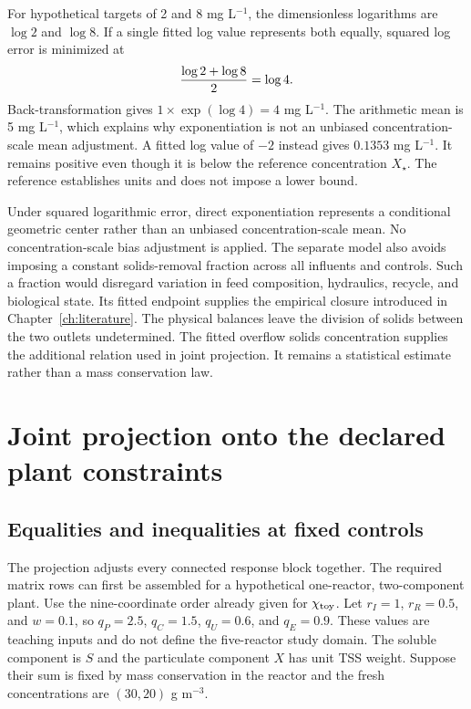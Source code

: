 For hypothetical targets of 2 and 8 mg L$^{-1}$, the dimensionless logarithms are $\log2$ and $\log8$. If a single fitted log value represents both equally, squared log error is minimized at
\begin{equation}
\equationname{Illustrative logarithmic average and geometric concentration mean}
\frac{\log2+\log8}{2}=\log4.
\end{equation}
Back-transformation gives $1\times\exp(\log4)=4$ mg L$^{-1}$. The arithmetic mean is 5 mg L$^{-1}$, which explains why exponentiation is not an unbiased concentration-scale mean adjustment. A fitted log value of $-2$ instead gives $0.1353$ mg L$^{-1}$. It remains positive even though it is below the reference concentration $X_\star$. The reference establishes units and does not impose a lower bound.

Under squared logarithmic error, direct exponentiation represents a conditional geometric center rather than an unbiased concentration-scale mean. No concentration-scale bias adjustment is applied. The separate model also avoids imposing a constant solids-removal fraction across all influents and controls. Such a fraction would disregard variation in feed composition, hydraulics, recycle, and biological state. Its fitted endpoint supplies the empirical closure introduced in Chapter~\ref{ch:literature}. The physical balances leave the division of solids between the two outlets undetermined. The fitted overflow solids concentration supplies the additional relation used in joint projection. It remains a statistical estimate rather than a mass conservation law.

\section{Joint projection onto the declared plant constraints}

\subsection{Equalities and inequalities at fixed controls}

The projection adjusts every connected response block together. The required matrix rows can first be assembled for a hypothetical one-reactor, two-component plant. Use the nine-coordinate order already given for $\chi_{\rm toy}$. Let $r_I=1$, $r_R=0.5$, and $w=0.1$, so $q_P=2.5$, $q_C=1.5$, $q_U=0.6$, and $q_E=0.9$. These values are teaching inputs and do not define the five-reactor study domain. The soluble component is $S$ and the particulate component $X$ has unit TSS weight. Suppose their sum is fixed by mass conservation in the reactor and the fresh concentrations are $(30,20)$ g m$^{-3}$.

